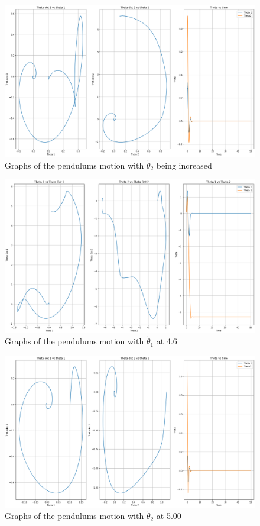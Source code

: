 \documentclass[linenumbers,RNAAS,trackchanges]{aastex631}
\begin{document}
\begin{figure}[H]
    \centering
    \centering
    \includegraphics[scale=.30]{td2.png}
    \caption{Graphs of the pendulums motion with $\dot\theta_2$ being increased}
    \label{fig:code}
\end{figure}
\begin{figure}[H]
    \centering
    \centering
    \includegraphics[scale=.30]{thetadot1.png}
    \caption{Graphs of the pendulums motion with $\dot\theta_1$ at 4.6}
    \label{fig:code}
\end{figure}
\begin{figure}[H]
    \centering
    \centering
    \includegraphics[scale=.30]{theta2.png}
    \caption{Graphs of the pendulums motion with $\dot\theta_2$ at 5.00}
    \label{fig:code}
\end{figure}
\end{document}

